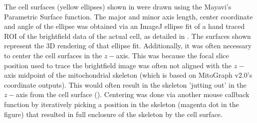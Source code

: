 The cell surfaces (yellow ellipses) shown in  were drawn using the Mayavi's Parametric Surface function. The major and minor axis length, center coordinate and angle of the ellipse was obtained via an ImageJ ellipse fit of a hand traced ROI of the brightfield data of the actual cell, as detailed in . The surfaces shown represent the 3D rendering of that ellipse fit. Additionally, it was often necessary to center the cell surfaces in the $z-$axis. This was because the focal slice position used to trace the brightfield image was often not aligned with the $z-$axis midpoint of the mitochondrial skeleton (which is based on MitoGraph v2.0's coordinate outputs). This would often result in the skeleton 'jutting out' in the $z-$axis from the cell surface (). Centering was done via another mouse callback function by iteratively picking a position in the skeleton (magenta dot in the figure) that resulted in full enclosure of the skeleton by the cell surface.

